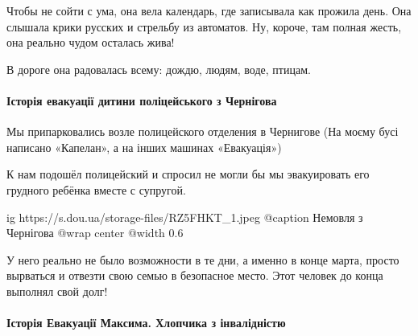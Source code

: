 Чтобы не сойти с ума, она вела календарь, где записывала как прожила день. Она
слышала крики русских и стрельбу из автоматов. Ну, короче, там полная жесть,
она реально чудом осталась жива!

В дороге она радовалась всему: дождю, людям, воде, птицам.

\paragraph{Історія евакуації дитини поліцейського з Чернігова}

Мы припарковались возле полицейского отделения в Чернигове (На моєму бусі
написано «Капелан», а на інших машинах «Евакуація»)

К нам подошёл полицейский и спросил не могли бы мы эвакуировать его грудного
ребёнка вместе с супругой.

\ifcmt
  ig https://s.dou.ua/storage-files/RZ5FHKT_1.jpeg
	@caption Немовля з Чернігова
  @wrap center
  @width 0.6
\fi

У него реально не было возможности в те дни, а именно в конце марта, просто
вырваться и отвезти свою семью в безопасное место. Этот человек до конца
выполнял свой долг!

\paragraph{Історія Евакуації Максима. Хлопчика з інвалідністю}

